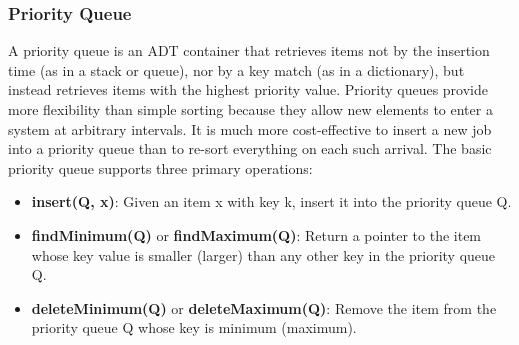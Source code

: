 \documentclass{article}
\begin{document}
    
    \subsubsection{Priority Queue}
    A priority queue is an ADT container that retrieves items not by the insertion time (as in a stack or queue), nor by a key match (as in a dictionary), but instead retrieves items with the highest priority value. Priority queues provide more flexibility than simple sorting because they allow new elements to enter a system at arbitrary intervals. It is much more cost-effective to insert a new job into a priority queue than to re-sort everything on each such arrival. The basic priority queue supports three primary operations:
    \begin{itemize}
        \item \textbf{insert(Q, x)}: Given an item x with key k, insert it into the priority queue Q.
        \item \textbf{findMinimum(Q)} or \textbf{findMaximum(Q)}: Return a pointer to the item whose key value is smaller (larger) than any other key in the priority queue Q.
        \item \textbf{deleteMinimum(Q)} or \textbf{deleteMaximum(Q)}: Remove the item from the priority queue Q whose key is minimum (maximum).
    \end{itemize}
\end{document}
